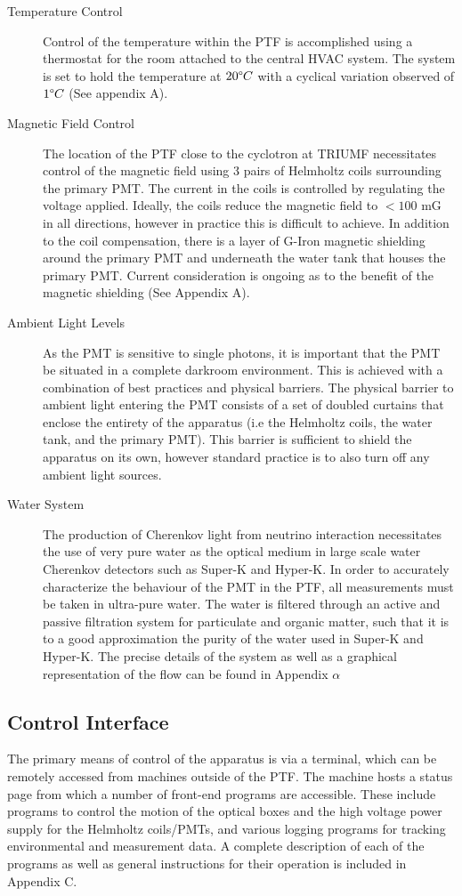 \documentclass[journal]{IEEEtran}
\begin{document}
\vskip 0.05in
\begin{description}
\item [Temperature Control]
Control of the temperature within the PTF is accomplished using a thermostat for the room attached to the central HVAC system.  The system is set to hold the temperature at $20\degree C$ with a cyclical variation observed of \texttildelow $1 \degree C$ (See appendix A).
\vskip 0.05in
\item [Magnetic Field Control]
The location of the PTF close to the cyclotron at TRIUMF necessitates control of the magnetic field using 3 pairs of Helmholtz coils surrounding the primary PMT.  The current in the coils is controlled by regulating the voltage applied.  Ideally, the coils reduce the magnetic field to $<100$ mG in all directions, however in practice this is difficult to achieve.  In addition to the coil compensation, there is a layer of G-Iron magnetic shielding around the primary PMT and underneath the water tank that houses the primary PMT. Current consideration is ongoing as to the benefit of the magnetic shielding (See Appendix A).
\vskip 0.05in
\item [Ambient Light Levels]
As the PMT is sensitive to single photons, it is important that the PMT be situated in a complete darkroom environment.  This is achieved with a combination of best practices and physical barriers.  The physical barrier to ambient light entering the PMT consists of a set of doubled curtains that enclose the entirety of the apparatus (i.e the Helmholtz coils, the water tank, and the primary PMT).  This barrier is sufficient to shield the apparatus on its own, however standard practice is to also turn off any ambient light sources. 
\vskip 0.05in
\item [Water System]
The production of Cherenkov light from neutrino interaction necessitates the use of very pure water as the optical medium in large scale water Cherenkov detectors such as Super-K and Hyper-K.  In order to accurately characterize the behaviour of the PMT in the PTF, all measurements must be taken in ultra-pure water.  The water is filtered through an active and passive filtration system for particulate and organic matter, such that it is to a good approximation the purity of the water used in Super-K and Hyper-K. The precise details of the system as well as a graphical representation of the flow can be found in Appendix $\alpha$ 
\end{description}

\subsection{Control Interface} 
The primary means of control of the apparatus is via a terminal, which can be remotely accessed from machines outside of the PTF. The machine hosts a status page from which a number of front-end programs are accessible.  These include programs to control the motion of the optical boxes and the high voltage power supply for the Helmholtz coils/PMTs, and various logging programs for tracking environmental and measurement data. A complete description of each of the programs as well as general instructions for their operation is included in Appendix C.
     
\end{document}

